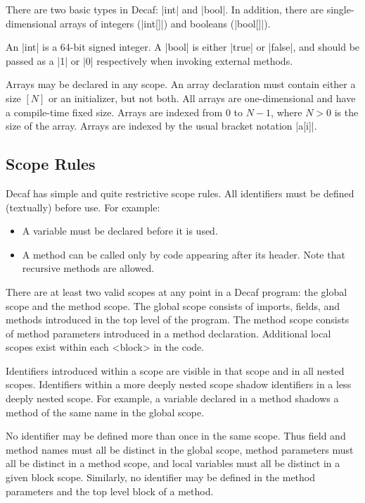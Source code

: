 \documentclass[11pt]{article}
\gdef\nt#1{{\bnf <#1>}}}
\begin{document}
There are two basic types in Decaf: \decaf|int| and \decaf|bool|.
In addition, there are single-dimensional arrays of integers (\decaf|int[]|) and booleans (\decaf|bool[]|).

An \decaf|int| is a 64-bit signed integer.
A \decaf|bool| is either \decaf|true| or \decaf|false|, and should be passed as a \decaf|1| or \decaf|0| respectively when invoking external methods.

Arrays may be declared in any scope.
An array declaration must contain either a size $[ N ]$ or an initializer, but not both.
All arrays are one-dimensional and have a compile-time fixed size.
Arrays are indexed from 0 to $N-1$, where $N > 0$ is the size of the array.
Arrays are indexed by the usual bracket notation \decaf|a[i]|.

\subsection{Scope Rules}

Decaf has simple and quite restrictive scope rules.
All identifiers must be defined (textually) before use.
For example:
\begin{itemize}
\item A variable must be declared before it is used.
\item A method can be called only by code appearing after its header.
  Note that recursive methods are allowed.
\end{itemize}

There are at least two valid scopes at any point in a Decaf program: the global scope and the method scope.
The global scope consists of imports, fields, and methods introduced in the top level of the program.
The method scope consists of method parameters introduced in a method declaration.
Additional local scopes exist within each \nt{block} in the code.

Identifiers introduced within a scope are visible in that scope and in all nested scopes.
Identifiers within a more deeply nested scope shadow identifiers in a less deeply nested scope.
For example, a variable declared in a method shadows a method of the same name in the global scope.

No identifier may be defined more than once in the same scope.
Thus field and method names must all be distinct in the global scope, method parameters must all be distinct in a method scope, and local variables must all be distinct in a given block scope.
Similarly, no identifier may be defined in the method parameters and the top level block of a method.
\end{document}
